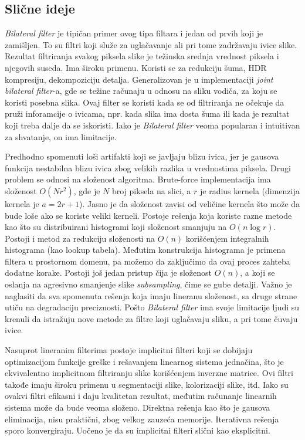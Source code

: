 \documentclass[a4paper,12pt,titlepage]{article}
\begin{document}
\subsection{Slične ideje}%

\emph{Bilateral filter} je tipičan primer ovog tipa filtara i jedan od prvih koji je zamišljen. To su filtri koji služe za uglačavanje ali pri tome zadržavaju ivice slike. Rezultat filtriranja svakog piksela slike je težinska srednja vrednost piksela i njegovih suseda. Ima široku primenu. Koristi se za redukciju šuma, HDR kompresiju, dekompoziciju detalja. Generalizovan je u implementaciji \emph{joint bilateral filter}-a, gde se težine računaju u odnosu na sliku vodiča, za koju se koristi posebna slika. Ovaj filter se koristi kada se od filtriranja ne očekuje da pruži inforamcije o ivicama, npr. kada slika ima dosta šuma ili kada je rezultat koji treba dalje da se iskoristi. Iako je \emph{Bilateral filter} veoma popularan i intuitivan za shvatanje, on ima limitacije. 

Predhodno spomenuti loši artifakti koji se javljaju blizu ivica, jer je gausova funkcija nestabilna blizu ivica zbog velikih razlika u vrednostima piksela. Drugi problem se odnosi na složenost algoritma. Brute-force implementacija ima složenost $O(Nr^2)$, gde je $N$ broj piksela na slici, a $r$ je radius kernela (dimenzija kernela je $a = 2r + 1$). Jasno je da složenost zavisi od veličine kernela što može da bude loše ako se koriste veliki kerneli. Postoje rešenja koja koriste razne metode kao što su distribuirani histogrami koji složenost smanjuju na $O(n \log{r})$. Postoji i metod za redukciju složenosti na $O(n)$ korišćenjem integralnih histograma (kao lookup tabela). Međutim konstrukcija histograma je primena filtera u prostornom domenu, pa možemo da zaključimo da ovaj proces zahteba dodatne korake. Postoji još jedan pristup čija je složenost $O(n)$, a koji se oslanja na agresivno smanjenje slike \emph{subsampling}, čime se gube detalji. Važno je naglasiti da sva spomenuta rešenja koja imaju lineranu složenost, sa druge strane utiču na degradaciju preciznosti. Pošto \emph{Bilateral filter} ima svoje limitacije ljudi su krenuli da istražuju nove metode za filtre koji uglačavaju sliku, a pri tome čuvaju ivice. 

Nasuprot lineranim filterima postoje implicitni filteri koji se dobijaju optimizacijom funkcije greške i rešavanjem linearnog sistema jednačina, što je ekvivalentno implicitnom filtriranju slike korišćenjem inverzne matrice. Ovi filtri takođe imaju široku primenu u segmentaciji slike, kolorizaciji slike, itd. Iako su ovakvi filtri efikasni i daju kvalitetan rezultat, međutim računanje linearnih sistema može da bude veoma složeno. Direktna rešenja kao što je gausova eliminacija, nisu praktični, zbog velkog zauzeća memorije. Iterativna rešenja sporo konvergiraju. Uočeno je da su implicitni filteri slični kao eksplicitni. 
\end{document}
